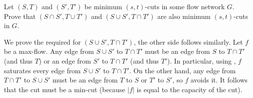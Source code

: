 	\begin{exercise}
		Let $(S,T)$ and $(S',T')$ be minimum $(s,t)$-cuts in some flow network $G$. Prove that $(S\cap S', T\cup T')$ and $(S\cup S', T\cap T')$ are also minimum $(s,t)$-cuts in $G$.
	\end{exercise}
	\begin{solution*}
		We prove the required for $(S\cup S', T\cap T')$, the other side follows similarly. Let $f$ be a max-flow. Any edge from $S\cup S'$ to $T\cap T'$ must be an edge from $S$ to $T\cap T'$ (and thus $T$) or an edge from $S'$ to $T\cap T'$ (and thus $T'$). In particular, using , $f$ saturates every edge from $S\cup S'$ to $T\cap T'$. On the other hand, any edge from $T\cap T'$ to $S\cup S'$ must be an edge from $T$ to $S$ or $T'$ to $S'$, so $f$ avoids it. It follows that the cut must be a min-cut (because $|f|$ is equal to the capacity of the cut).
	\end{solution*}
